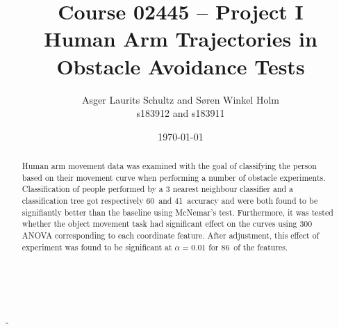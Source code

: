 \documentclass[11pt,fleqn]{article}
\title{Course 02445 -- Project I\\Human Arm Trajectories in Obstacle Avoidance Tests}
\author{Asger Laurits Schultz and Søren Winkel Holm\\s183912 and s183911}
\date{\today}
\begin{document}
\maketitle
\thispagestyle{empty}
\renewcommand{\abstractname}{Summary}

\begin{figure}[H]
	\centering
	\\
\end{figure}

\newpage
\setcounter{page}{1}-
\begin{abstract}\noindent 
Human arm movement data was examined with the goal of classifying the person based on their movement curve when performing a number of obstacle experiments.
Classification of people performed by a 3 nearest neighbour classifier and a classification tree got respectively 60\pro\ and 41\pro\ accuracy and were both found to be signifiantly better than the baseline using McNemar's test.  
Furthermore, it was tested whether the object movement task had significant effect on the  curves using 300 ANOVA corresponding to each coordinate feature. 
After adjustment, this effect of experiment was found to be significant at \(\alpha=0.01\) for 86\pro\ of the features.
\end{abstract}
\end{document}
